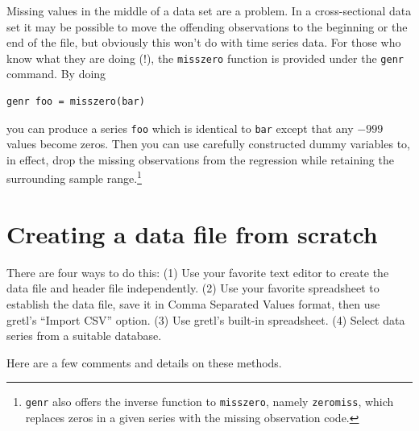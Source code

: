 \documentclass{article}
\begin{document}
Missing values in the middle of a data set are a problem.  In a
cross-sectional data set it may be possible to move the offending
observations to the beginning or the end of the file, but obviously
this won't do with time series data.  For those who know what they are
doing (!), the \texttt{misszero} function is provided under the
\texttt{genr} command.  By doing 

\begin{verbatim}
genr foo = misszero(bar)
\end{verbatim}

you can produce a series \texttt{foo} which is identical to
\texttt{bar} except that any $-999$ values become zeros.  Then you can
use carefully constructed dummy variables to, in effect, drop the
missing observations from the regression while retaining the
surrounding sample range.\footnote{\texttt{genr} also offers the inverse
function to \texttt{misszero}, namely \texttt{zeromiss}, which replaces
zeros in a given series with the missing observation code.}

\section{Creating a data file from scratch}
\label{scratch}

There are four ways to do this: (1) Use your favorite text editor to
create the data file and header file independently.
(2) Use your favorite spreadsheet to establish the data file, save it
in Comma Separated Values format, then use \textsf{gretl}'s ``Import
CSV'' option. (3) Use \textsf{gretl}'s built-in spreadsheet. (4)
Select data series from a suitable database.

Here are a few comments and details on these methods.
\end{document}
